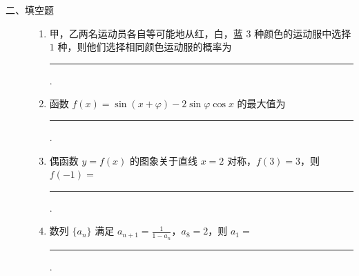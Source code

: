 \begin{description}

    \item[二、填空题]

    \begin{enumerate}[leftmargin=5pt]

      \addtocounter{enumi}{+12}

        \item 甲，乙两名运动员各自等可能地从红，白，蓝 \(3\) 种颜色的运动服中选择 \(1\) 种，则他们选择相同颜色运动服的概率为\rule[-0.3ex]{3em}{0.4pt}.

        \item 函数 \(f(x)=\sin\left(x+\varphi\right)-2\sin\varphi\cos x\) 的最大值为\rule[-0.3ex]{3em}{0.4pt}.

        \item 偶函数 \(y=f(x)\) 的图象关于直线 \(x=2\) 对称，\(f(3)=3\)，则 \(f(-1)=\)\rule[-0.3ex]{3em}{0.4pt}.

        \item 数列 \(\{a_n\}\) 满足 \(a_{n+1}=\frac{1}{1-a_n}\)，\(a_8=2\)，则 \(a_1=\)\rule[-0.3ex]{3em}{0.4pt}.

    \end{enumerate}

\end{description}

